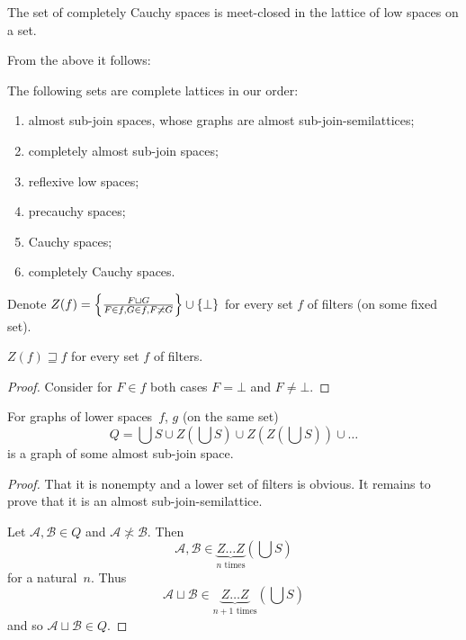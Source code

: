 \begin{cor}
The set of completely Cauchy spaces is meet-closed in the lattice of low spaces on a set.
\end{cor}

From the above it follows:

\begin{obvious}
The following sets are complete lattices in our order:
\begin{enumerate}
\item almost sub-join spaces, whose graphs are almost sub-join-semilattices;
\item completely almost sub-join spaces;
\item reflexive low spaces;
\item precauchy spaces;
\item Cauchy spaces;
\item completely Cauchy spaces.
\end{enumerate}
\end{obvious}

Denote $Z(f)=\left\{ \frac{F\sqcup G}{F\in f,G\in f,F\not\asymp G}\right\}\cup\{\bot\}$ for every set $f$ of filters (on some fixed set).

\begin{prop}
$Z(f)\sqsupseteq f$ for every set $f$ of filters.
\end{prop}

\begin{proof}
Consider for $F\in f$ both cases $F=\bot$ and $F\ne\bot$.
\end{proof}

\begin{lem}
For graphs of lower spaces~$f$, $g$ (on the same set)
\[
Q = \bigcup S\cup Z\left(\bigcup S\right)\cup Z\left(Z\left(\bigcup S\right)\right)\cup\dots
\]
is a graph of some almost sub-join space.
\end{lem}

\begin{proof}
That it is nonempty and a lower set of filters is obvious. It remains to prove that it is an almost sub-join-semilattice.

Let $\mathcal{A},\mathcal{B}\in Q$ and $\mathcal{A}\nasymp\mathcal{B}$.
Then
\[
\mathcal{A},\mathcal{B} \in \underbrace{Z\dots Z}_{n\text{ times}}\left(\bigcup S\right)
\]
for a natural~$n$. Thus
\[
\mathcal{A}\sqcup\mathcal{B} \in \underbrace{Z\dots Z}_{n+1\text{ times}}\left(\bigcup S\right)
\]
and so $\mathcal{A}\sqcup\mathcal{B}\in Q$.
\end{proof}

